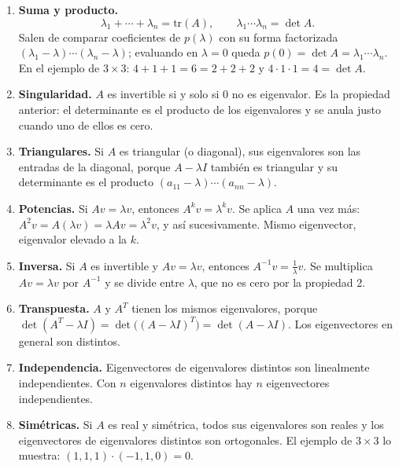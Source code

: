 \documentclass[11pt,letterpaper]{article}
\begin{document}
\begin{enumerate}[itemsep=0.3em]
    \item \textbf{Suma y producto.}
          \[
              \lambda_1 + \cdots + \lambda_n = \mathrm{tr}(A) ,
              \qquad
              \lambda_1 \cdots \lambda_n = \det A .
          \]
          Salen de comparar coeficientes de $p(\lambda)$ con su forma
          factorizada $(\lambda_1 - \lambda) \cdots
          (\lambda_n - \lambda)$; evaluando en $\lambda = 0$ queda
          $p(0) = \det A = \lambda_1 \cdots \lambda_n$. En el ejemplo
          de $3 \times 3$: $4 + 1 + 1 = 6 = 2 + 2 + 2$ y
          $4 \cdot 1 \cdot 1 = 4 = \det A$.
    \item \textbf{Singularidad.} $A$ es invertible si y solo si $0$
          no es eigenvalor. Es la propiedad anterior: el determinante
          es el producto de los eigenvalores y se anula justo cuando
          uno de ellos es cero.
    \item \textbf{Triangulares.} Si $A$ es triangular (o diagonal),
          sus eigenvalores son las entradas de la diagonal, porque
          $A - \lambda I$ también es triangular y su determinante es
          el producto $(a_{11} - \lambda) \cdots (a_{nn} - \lambda)$.
    \item \textbf{Potencias.} Si $Av = \lambda v$, entonces
          $A^k v = \lambda^k v$. Se aplica $A$ una vez más:
          $A^2 v = A(\lambda v) = \lambda A v = \lambda^2 v$, y así
          sucesivamente. Mismo eigenvector, eigenvalor elevado a la
          $k$.
    \item \textbf{Inversa.} Si $A$ es invertible y $Av = \lambda v$,
          entonces $A^{-1} v = \tfrac{1}{\lambda} v$. Se multiplica
          $Av = \lambda v$ por $A^{-1}$ y se divide entre $\lambda$,
          que no es cero por la propiedad 2.
    \item \textbf{Transpuesta.} $A$ y $A^{T}$ tienen los mismos
          eigenvalores, porque $\det(A^{T} - \lambda I)
          = \det\big((A - \lambda I)^{T}\big) = \det(A - \lambda I)$.
          Los eigenvectores en general son distintos.
    \item \textbf{Independencia.} Eigenvectores de eigenvalores
          distintos son linealmente independientes. Con $n$
          eigenvalores distintos hay $n$ eigenvectores independientes.
    \item \textbf{Simétricas.} Si $A$ es real y simétrica, todos sus
          eigenvalores son reales y los eigenvectores de eigenvalores
          distintos son ortogonales. El ejemplo de $3 \times 3$ lo
          muestra: $(1, 1, 1) \cdot (-1, 1, 0) = 0$.
\end{enumerate}
\end{document}
